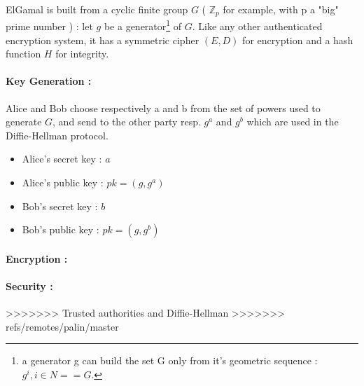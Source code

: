 ElGamal is built from a cyclic finite group $G$ ( $\mathbb{Z}_p$ for example, with p a "big" prime number ) : let $g$ be a generator\footnote{a generator g can build the set G only from it's geometric sequence : ${g^i, i\in N} == G$.}  of $G$. Like any other authenticated encryption system, it has a symmetric cipher $(E,D)$ for encryption and a hash function $H$ for integrity.

\paragraph{Key Generation :}
 Alice and Bob choose respectively a and b from the set of powers used to generate $G$, and send to the other party resp. $g^a$ and $g^b$ which are used in the Diffie-Hellman protocol. \\
 
\begin{itemize}
	\item Alice's secret key : $a$
	\item Alice's public key : $pk = (g, g^a)$
	\item Bob's secret key : $b$
	\item Bob's public key : $pk = (g, g^b)$
\end{itemize}
 
\paragraph{Encryption :}




\paragraph{Security : \\}



>>>>>>> Trusted authorities and Diffie-Hellman
>>>>>>> refs/remotes/palin/master
